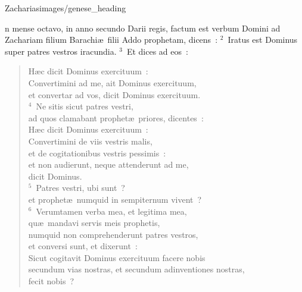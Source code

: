{Zacharias}{images/genese_heading}


\bchapter
{}n mense octavo, in anno secundo Darii regis, factum est verbum Domini ad Zachariam filium Barachi\ae\ filii Addo prophetam, dicens~:
${}^{2}$~Iratus est Dominus super patres vestros iracundia.
${}^{3}$~Et dices ad eos~: \begin{flushleft}\begin{verse}H\ae c dicit Dominus exercituum~:\\ Convertimini ad me, ait Dominus exercituum,\\ et convertar ad vos, dicit Dominus exercituum.\\
${}^{4}$~Ne sitis sicut patres vestri,\\ ad quos clamabant prophet\ae\ priores, dicentes~:\\ H\ae c dicit Dominus exercituum~:\\ Convertimini de viis vestris malis,\\ et de cogitationibus vestris pessimis~:\\ et non audierunt, neque attenderunt ad me,\\ dicit Dominus.\\
${}^{5}$~Patres vestri, ubi sunt~?\\ et prophet\ae\ numquid in sempiternum vivent~?\\
${}^{6}$~Verumtamen verba mea, et legitima mea,\\ qu\ae\ mandavi servis meis prophetis,\\ numquid non comprehenderunt patres vestros,\\ et conversi sunt, et dixerunt~:\\ Sicut cogitavit Dominus exercituum facere nobis\\ secundum vias nostras, et secundum adinventiones nostras,\\ fecit nobis~?\end{verse}\end{flushleft}


